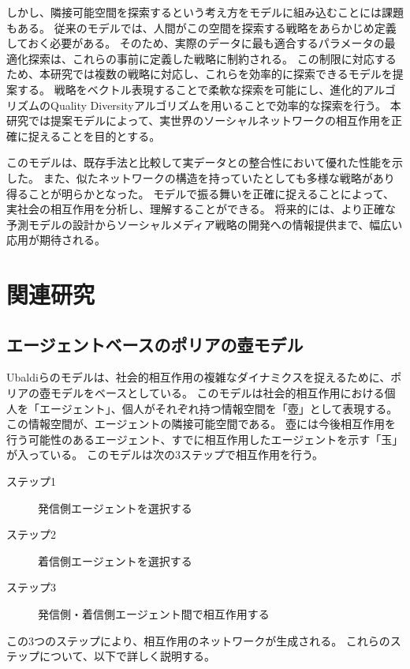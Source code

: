 \documentclass[uplatex,11pt,openany]{ujreport}
\begin{document}
    しかし、隣接可能空間を探索するという考え方をモデルに組み込むことには課題もある。
    従来のモデルでは、人間がこの空間を探索する戦略をあらかじめ定義しておく必要がある。
    そのため、実際のデータに最も適合するパラメータの最適化探索は、これらの事前に定義した戦略に制約される\cite{sudaExplorationExploitationAdjacent2022,sudaAgentbasedModelUsing2022, ubaldiEmergenceEvolutionSocial2021}。
    この制限に対応するため、本研究では複数の戦略に対応し、これらを効率的に探索できるモデルを提案する。
    戦略をベクトル表現することで柔軟な探索を可能にし、進化的アルゴリズムのQuality Diversityアルゴリズムを用いることで効率的な探索を行う。
    本研究では提案モデルによって、実世界のソーシャルネットワークの相互作用を正確に捉えることを目的とする。

    このモデルは、既存手法と比較して実データとの整合性において優れた性能を示した。
    また、似たネットワークの構造を持っていたとしても多様な戦略があり得ることが明らかとなった。
    モデルで振る舞いを正確に捉えることによって、実社会の相互作用を分析し、理解することができる。
    将来的には、より正確な予測モデルの設計からソーシャルメディア戦略の開発への情報提供まで、幅広い応用が期待される。





\chapter{関連研究}
    \section{エージェントベースのポリアの壺モデル}
    Ubaldiらのモデルは、社会的相互作用の複雑なダイナミクスを捉えるために、ポリアの壺モデルをベースとしている\cite{ubaldiEmergenceEvolutionSocial2021}。
    このモデルは社会的相互作用における個人を「エージェント」、個人がそれぞれ持つ情報空間を「壺」として表現する。
    この情報空間が、エージェントの隣接可能空間である。
    壺には今後相互作用を行う可能性のあるエージェント、すでに相互作用したエージェントを示す「玉」が入っている。
    このモデルは次の3ステップで相互作用を行う。
        \begin{description}
            \item[ステップ1] 発信側エージェントを選択する
            \item[ステップ2] 着信側エージェントを選択する
            \item[ステップ3] 発信側・着信側エージェント間で相互作用する
        \end{description}
    この3つのステップにより、相互作用のネットワークが生成される。
    これらのステップについて、以下で詳しく説明する。
\end{document}
